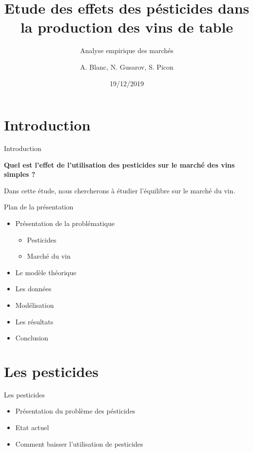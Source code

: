 \documentclass[11pt,ignorenonframetext,]{beamer}
\title{Etude des effets des pésticides dans la production des vins de table}
\subtitle{Analyse empirique des marchés}
\author{A. Blanc, N. Gusarov, S. Picon}
\institute{Université Grenoble Alpes}
\date{19/12/2019}
\providecommand{\tightlist}{%
  \setlength{\itemsep}{0pt}\setlength{\parskip}{0pt}}
\begin{document}
\frame{\titlepage}

\hypertarget{introduction}{%
\section{Introduction}\label{introduction}}

\begin{frame}{Introduction}
\protect\hypertarget{introduction-1}{}

\center

\textbf{Quel est l'effet de l'utilisation des pesticides sur le marché des vins simples ?}

Dans cette étude, nous chercherons à étudier l'équilibre sur le marché
du vin.

\end{frame}

\begin{frame}{Plan de la présentation}
\protect\hypertarget{plan-de-la-presentation}{}

\begin{itemize}
\tightlist
\item
  Présentation de la problématique

  \begin{itemize}
  \tightlist
  \item
    Pesticides
  \item
    Marché du vin
  \end{itemize}
\item
  Le modèle théorique
\item
  Les données
\item
  Modélisation
\item
  Les résultats
\item
  Conclusion
\end{itemize}

\end{frame}

\hypertarget{les-pesticides}{%
\section{Les pesticides}\label{les-pesticides}}

\begin{frame}{Les pesticides}
\protect\hypertarget{les-pesticides-1}{}

\begin{itemize}
\tightlist
\item
  Présentation du problème des pésticides
\item
  Etat actuel
\item
  Comment baisser l'utilisation de pesticides
\end{itemize}

\end{frame}
\end{document}

